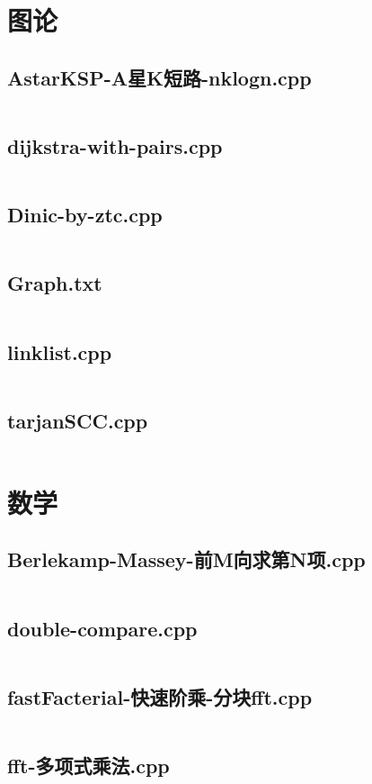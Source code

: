 \documentclass[a4paper,landscape,twocolumn]{article} %
\begin{document}
\section{图论}
\subsection{AstarKSP-A星K短路-nklogn.cpp}
\inputminted{c++}{./codes/009}
\subsection{dijkstra-with-pairs.cpp}
\inputminted{c++}{./codes/010}
\subsection{Dinic-by-ztc.cpp}
\inputminted{c++}{./codes/011}
\subsection{Graph.txt}
\inputminted{text}{./codes/012}
\subsection{linklist.cpp}
\inputminted{c++}{./codes/013}
\subsection{tarjanSCC.cpp}
\inputminted{c++}{./codes/014}
\section{数学}
\subsection{Berlekamp-Massey-前M向求第N项.cpp}
\inputminted{c++}{./codes/015}
\subsection{double-compare.cpp}
\inputminted{c++}{./codes/016}
\subsection{fastFacterial-快速阶乘-分块fft.cpp}
\inputminted{c++}{./codes/017}
\subsection{fft-多项式乘法.cpp}
\inputminted{c++}{./codes/018}
\end{document}
